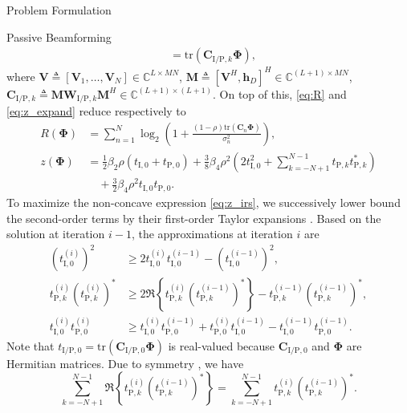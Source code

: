 \begin{section}{Problem Formulation}
\begin{subsection}{Passive Beamforming}
\begin{align}
			& = \mathrm{tr}(\boldsymbol{C}_{\mathrm{I/P},k}\boldsymbol{\Phi})\label{eq:t_k},
		\end{align}
		where $\boldsymbol{V} \triangleq [\boldsymbol{V}_1,\dots,\boldsymbol{V}_N] \in \mathbb{C}^{L \times MN}$, $\boldsymbol{M} \triangleq [\boldsymbol{V}^H, \boldsymbol{h}_{D}]^H \in \mathbb{C}^{(L+1) \times MN}$, $\boldsymbol{C}_{\mathrm{I/P},k} \triangleq \boldsymbol{M}\boldsymbol{W}_{\mathrm{I/P},k}\boldsymbol{M}^H \in \mathbb{C}^{(L+1)\times(L+1)}$. On top of this, \eqref{eq:R} and \eqref{eq:z_expand} reduce respectively to
		\begin{align}
			R(\boldsymbol{\Phi})
			& = \sum_{n=1}^{N}{\log_2\left(1+\frac{(1-\rho)\mathrm{tr}(\boldsymbol{C}_n\boldsymbol{\Phi})}{\sigma_n^2}\right)},\label{eq:R_irs}\\
			z(\boldsymbol{\Phi})
			& = \frac{1}{2}{\beta_2}{\rho}(t_{\mathrm{I},0}+t_{\mathrm{P},0}) + \frac{3}{8}{\beta_4}{\rho^2} \left(2t_{\mathrm{I},0}^2 + \sum_{k=-N+1}^{N-1}{t_{\mathrm{P},k}t_{\mathrm{P},k}^*}\right)\nonumber\\
			& \quad + \frac{3}{2}{\beta_4}{\rho^2}t_{\mathrm{I},0}t_{\mathrm{P},0}.\label{eq:z_irs}
		\end{align}
		To maximize the non-concave expression \eqref{eq:z_irs}, we successively lower bound the second-order terms by their first-order Taylor expansions \cite{Adali2010}. Based on the solution at iteration $i - 1$, the approximations at iteration $i$ are
		\begin{align}
			(t_{\mathrm{I},0}^{(i)})^2
			& \ge 2 t_{\mathrm{I},0}^{(i)}t_{\mathrm{I},0}^{(i-1)} - (t_{\mathrm{I},0}^{(i-1)})^2,\label{eq:taylor_1}\\
			t_{\mathrm{P},k}^{(i)} (t_{\mathrm{P},k}^{(i)})^*
			& \ge 2 \Re\left\{t_{\mathrm{P},k}^{(i)} (t_{\mathrm{P},k}^{(i-1)})^*\right\} - t_{\mathrm{P},k}^{(i-1)} (t_{\mathrm{P},k}^{(i-1)})^*,\label{eq:taylor_2}\\
			t_{\mathrm{I},0}^{(i)} t_{\mathrm{P},0}^{(i)}
			& \ge t_{\mathrm{I},0}^{(i)} t_{\mathrm{P},0}^{(i-1)} + t_{\mathrm{P},0}^{(i)} t_{\mathrm{I},0}^{(i-1)} - t_{\mathrm{I},0}^{(i-1)} t_{\mathrm{P},0}^{(i-1)}.\label{eq:taylor_3}
		\end{align}
		Note that $t_{\mathrm{I/P},0}=\mathrm{tr}(\boldsymbol{C}_{\mathrm{I/P},0}\boldsymbol{\Phi})$ is real-valued because $\boldsymbol{C}_{\mathrm{I/P},0}$ and $\boldsymbol{\Phi}$ are Hermitian matrices. Due to symmetry \cite{Golub2013}, we have
		\begin{equation}\label{eq:coupled_terms}
			\sum_{k=-N+1}^{N-1} \Re\left\{t_{\mathrm{P},k}^{(i)} (t_{\mathrm{P},k}^{(i-1)})^*\right\} = \sum_{k=-N+1}^{N-1} t_{\mathrm{P},k}^{(i)} (t_{\mathrm{P},k}^{(i-1)})^*.

\end{equation}
\end{subsection}
\end{section}
